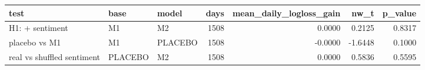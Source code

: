 \begin{tabular}{lllrrrr}
\toprule
test & base & model & days & mean\_daily\_logloss\_gain & nw\_t & p\_value \\
\midrule
H1: + sentiment & M1 & M2 & 1508 & 0.0000 & 0.2125 & 0.8317 \\
placebo vs M1 & M1 & PLACEBO & 1508 & -0.0000 & -1.6448 & 0.1000 \\
real vs shuffled sentiment & PLACEBO & M2 & 1508 & 0.0000 & 0.5836 & 0.5595 \\
\bottomrule
\end{tabular}
